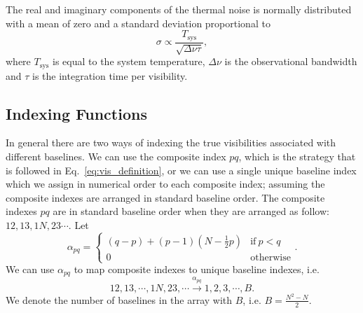 \documentclass[useAMS,usenatbib]{mn2e}
\begin{document}
The real and imaginary components of the thermal noise is normally distributed with a mean of zero and a standard deviation proportional to   
\begin{equation}
\sigma \propto \frac{T_{\textrm{sys}}}{\sqrt{\Delta \nu \tau}}, 
\end{equation}
where $T_{\textrm{sys}}$ is equal to the system temperature, $\Delta \nu$ is the observational bandwidth and $\tau$ is the integration time per visibility. 

\subsection{Indexing Functions}
\label{sec:indexing}
In general there are two ways of indexing the true visibilities associated with different baselines. We can use the composite index $pq$, which is the strategy that is followed in Eq.~\eqref{eq:vis_definition},
or we can use a single unique baseline index which we assign in numerical order to each composite index; assuming the composite indexes are arranged in standard baseline order.
The composite indexes $pq$ are in standard baseline order when they are arranged as follow: $12, 13, 1N, 23\cdots$. Let 
\begin{equation}
\alpha_{pq} =
\begin{cases}
(q-p) + (p-1)\left (N-\frac{1}{2}p \right ) & \textrm{if}~p<q\\
0 & \textrm{otherwise}
\end{cases}.
\end{equation}
We can use $\alpha_{pq}$ to map composite indexes to unique baseline indexes, i.e. 
\begin{equation}
12,13,\cdots,1N,23,\cdots \xrightarrow{\alpha_{pq}} 1,2,3,\cdots,B.
\end{equation}
We denote the number of baselines in the array with $B$, i.e. $B = \frac{N^2-N}{2}$.
\end{document}
